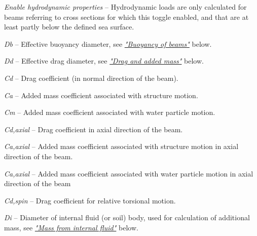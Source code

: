 \begin{bulletlist}
\item{\sl Enable hydrodynamic properties} --
  Hydrodynamic loads are only calculated for beams referring to cross sections
  for which this toggle enabled, and that are at least partly below the defined
  sea surface.
\item{\sl Db} -- Effective buoyancy diameter,
  see \protect\hyperlink{buoyancy-of-beams}{\sl"Buoyancy of beams"} below.
\item{\sl Dd} -- Effective drag diameter,
  see \protect\hyperlink{drag-and-added-mass}{\sl"Drag and added mass"} below.
\item{\sl Cd} -- Drag coefficient (in normal direction of the beam).
\item{\sl Ca} -- Added mass coefficient associated with structure motion.
\item{\sl Cm} -- Added mass coefficient associated with water particle motion.
\item{\sl Cd,axial} -- Drag coefficient in axial direction of the beam.
\item{\sl Ca,axial} -- Added mass coefficient associated with structure motion
  in axial direction of the beam.
\item{\sl Ca,axial} -- Added mass coefficient associated with water particle
  motion in axial direction of the beam
\item{\sl Cd,spin} -- Drag coefficient for relative torsional motion.
\item{\sl Di} -- Diameter of internal fluid (or soil) body,
used for calculation of additional mass,
see \protect\hyperlink{mass-from-internal-fluid}{\sl"Mass from internal fluid"}
below.
\end{bulletlist}



